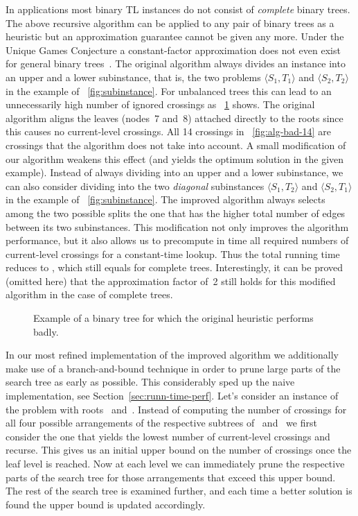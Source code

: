 \documentclass[runningheads,a4paper]{llncs}
\newcommand{\ttree}[1]{\ensuremath{\langle #1 \rangle}}
\begin{document}
In applications most binary TL instances do not consist of \emph{complete} binary
trees. The above recursive algorithm can be applied to any pair of
binary trees as a heuristic but an approximation guarantee cannot be
given any more. Under the Unique Games Conjecture a constant-factor
approximation does not even exist for general binary
trees~\cite{bbbnow-dbtha-08}. The original algorithm always divides an
instance into an upper and a lower subinstance, that is, the two problems
\ttree{S_1,T_1} and \ttree{S_2,T_2} in the example of
\figurename~\ref{fig:subinstance}. For unbalanced trees this can lead
to an unnecessarily high number of ignored crossings as
\figurename~\ref{fig:alg-bad} shows.  The original algorithm aligns
the leaves (nodes~7 and~8) attached directly to the roots since this causes no current-level
crossings. All 14 crossings in \figurename~\ref{fig:alg-bad-14} are
crossings that the algorithm does not take into account. A small
modification of our algorithm weakens this effect (and yields the
optimum solution in the given example). Instead of always dividing
into an upper and a lower subinstance, we can also consider dividing
into the two \emph{diagonal} subinstances \ttree{S_1,T_2} and
\ttree{S_2,T_1} in the example of
\figurename~\ref{fig:subinstance}. The improved algorithm always
selects among the two possible splits the one that has the higher
total number of edges between its two subinstances. This modification
not only improves the algorithm performance, but it also allows us to
precompute in  time all required numbers of current-level
crossings for a constant-time lookup.
Thus the total running time reduces to , which still
equals  for complete trees.  Interestingly, it can be proved
(omitted here) that the approximation factor of~2 still holds for this
modified algorithm in the case of complete trees.

\begin{figure}[tb]
  \centering
  \hfil
  \caption{Example of a binary tree for which the original heuristic performs badly.}
  \label{fig:alg-bad}
\end{figure}

In our most refined implementation of the improved algorithm we
additionally make use of a branch-and-bound technique in order to
prune large parts of the search tree as early as possible.  This
considerably sped up the naive implementation, see
Section~\ref{sec:runn-time-perf}. Let's consider an instance of the
problem with roots~ and~. Instead of computing the
number of crossings for all four possible arrangements of the
respective subtrees of~ and~ we first consider the one
that yields the lowest number of current-level crossings and
recurse. This gives us an initial upper bound on the number of
crossings once the leaf level is reached. Now at each level we can
immediately prune the respective parts of the search tree for those
arrangements that exceed this upper bound. The rest of the search tree
is examined further, and each time a better solution is found the
upper bound is updated accordingly.
\end{document}
